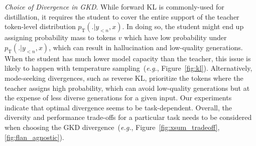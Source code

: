 \documentclass{article} %
\newcommand{\E}{\mathbb{E}}
\def\D{\mathcal{D}}
\newcommand{\stu}[0]{p_{\text{S}}}
\newcommand{\tea}[0]{p_{\text{T}}}
\newcommand{\mfg}[1]{{\color{purple}[mfg: #1]}}
\newcommand{\addtext}[1]{#1}
\begin{document}
\emph{Choice of Divergence in GKD}. While forward KL is commonly-used for distillation, it requires the student to cover the entire support of the teacher token-level distribution $\tea(.|y_{<n}, x)$. In doing so, the student might end up assigning probability mass to tokens $v$ which have low probability under $\tea(.|y_{<n}, x)$, which can result in hallucination and low-quality generations. 
When the student has much lower model capacity than the teacher, this issue is likely to happen with temperature sampling~(\emph{e.g.}, Figure~\ref{fig:kl}). Alternatively, mode-seeking divergences, such as reverse KL, prioritize the tokens where the teacher assigns high probability, which can avoid low-quality generations but at the expense of less diverse generations for a given input. Our experiments indicate that optimal divergence seems to be task-dependent. Overall, the diversity and performance trade-offs for a particular task needs to be considered when choosing the GKD divergence~(\emph{e.g.}, Figure~\ref{fig:xsum_tradeoff}, \addtext{\ref{fig:flan_agnostic}}). 

\end{document}
